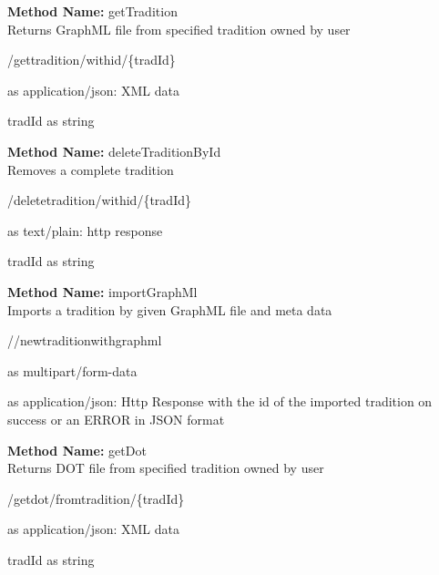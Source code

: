 \textbf{Method Name: }getTradition \\ Returns GraphML file from specified tradition owned by user
\begin{get}
/gettradition/withid/\{tradId\}
\end{get}
\begin{response}
 as application/json: XML data
\end{response}
\begin{parameter}
tradId as string
\end{parameter}
\textbf{Method Name: }deleteTraditionById \\ Removes a complete tradition
\begin{delete}
/deletetradition/withid/\{tradId\}
\end{delete}
\begin{response}
 as text/plain: http response
\end{response}
\begin{parameter}
tradId as string
\end{parameter}
\textbf{Method Name: }importGraphMl \\ Imports a tradition by given GraphML file and meta data
\begin{post}
//newtraditionwithgraphml
\end{post}
\begin{request}
 as multipart/form-data
\end{request}
\begin{response}
 as application/json: Http Response with the id of the imported tradition on success or an ERROR in JSON format
\end{response}
\textbf{Method Name: }getDot \\ Returns DOT file from specified tradition owned by user
\begin{get}
/getdot/fromtradition/\{tradId\}
\end{get}
\begin{response}
 as application/json: XML data
\end{response}
\begin{parameter}
tradId as string
\end{parameter}
